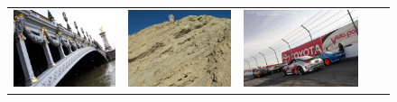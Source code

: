 \begin{figure}[!ht]
\begin{tabular}{c|cccc}
\includegraphics[height=\retrievalwidth\linewidth]{figures/applications/matching_horizon_group_3/00006311_jpg_0_06015428226537748.jpg} &
\includegraphics[height=\retrievalwidth\linewidth]{figures/applications/matching_horizon_group_3/00004613_jpg_0_10938281689401162.jpg} &
\includegraphics[height=\retrievalwidth\linewidth]{figures/applications/matching_horizon_group_3/00003549_jpg_0_040089855903650634.jpg} \\

\end{tabular}
\end{figure}
